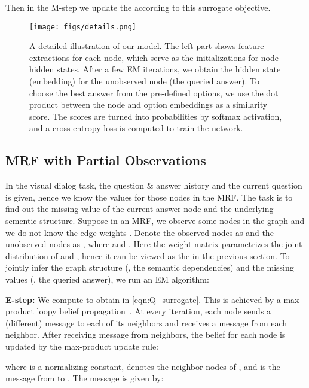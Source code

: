\documentclass[10pt,twocolumn,letterpaper]{article}
\begin{document}
Then in the M-step we update the  according to this surrogate objective.

\begin{figure*}[t]
\centering
      \texttt{[image: figs/details.png]}
\caption{\small A detailed illustration of our model. The left part shows feature extractions for each node, which serve as the initializations for node hidden states. After a few EM iterations, we obtain the hidden state (embedding) for the unobserved node (the queried answer). To choose the best answer from the pre-defined options, we use the dot product between the node and option embeddings as a similarity score. The scores are turned into probabilities by softmax activation, and a cross entropy loss is computed to train the network.}
\label{fig:details}
\vspace{-12pt}
\end{figure*}

\subsection{MRF with Partial Observations}
In the visual dialog task, the question \& answer history and the current question is given, hence we know the values for those nodes in the MRF. The task is to find out the missing value of the current answer node and the underlying sementic structure. Suppose in an MRF, we observe some nodes in the graph and we do not know the edge weights . Denote the observed nodes as  and the unobserved nodes as , where  and . Here the weight matrix  parametrizes the joint distribution of  and , hence it can be viewed as the  in the previous section. To jointly infer  the graph structure (\eg, the semantic dependencies) and  the missing values (\eg, the queried answer), we run an EM algorithm:

\noindent\textbf{E-step:} We compute  to obtain  in \autoref{eqn:Q_surrogate}. This is achieved by a max-product loopy belief propagation~\cite{weiss2001optimality}. At every iteration, each node sends a (different) message to each of its neighbors and receives a message from each neighbor. After receiving message from neighbors, the belief  for each node  is updated by the max-product update rule:
\vspace{-2pt}

where  is a normalizing constant,  denotes the neighbor nodes of , and  is the message from  to . The message is given by:
\vspace*{-2pt}
\end{document}
